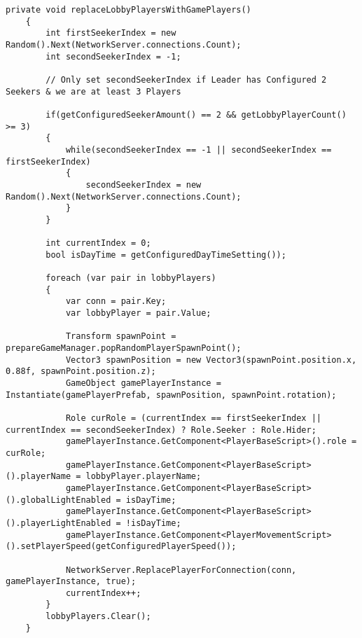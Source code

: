 \begin{lstlisting}[caption= GameNetworkManager.cs replaceLobbyPlayersWithGamePlayers()]
	private void replaceLobbyPlayersWithGamePlayers()
	{
		int firstSeekerIndex = new Random().Next(NetworkServer.connections.Count);
		int secondSeekerIndex = -1;
		
		// Only set secondSeekerIndex if Leader has Configured 2 Seekers & we are at least 3 Players
		
		if(getConfiguredSeekerAmount() == 2 && getLobbyPlayerCount() >= 3)
		{
			while(secondSeekerIndex == -1 || secondSeekerIndex == firstSeekerIndex)
			{
				secondSeekerIndex = new Random().Next(NetworkServer.connections.Count);
			}
		}
		
		int currentIndex = 0;
		bool isDayTime = getConfiguredDayTimeSetting());
		
		foreach (var pair in lobbyPlayers)
		{
			var conn = pair.Key;
			var lobbyPlayer = pair.Value;
			
			Transform spawnPoint = prepareGameManager.popRandomPlayerSpawnPoint();
			Vector3 spawnPosition = new Vector3(spawnPoint.position.x, 0.88f, spawnPoint.position.z);
			GameObject gamePlayerInstance = Instantiate(gamePlayerPrefab, spawnPosition, spawnPoint.rotation);
			
			Role curRole = (currentIndex == firstSeekerIndex || currentIndex == secondSeekerIndex) ? Role.Seeker : Role.Hider;
			gamePlayerInstance.GetComponent<PlayerBaseScript>().role = curRole;
			gamePlayerInstance.GetComponent<PlayerBaseScript>().playerName = lobbyPlayer.playerName;
			gamePlayerInstance.GetComponent<PlayerBaseScript>().globalLightEnabled = isDayTime;
			gamePlayerInstance.GetComponent<PlayerBaseScript>().playerLightEnabled = !isDayTime;
			gamePlayerInstance.GetComponent<PlayerMovementScript>().setPlayerSpeed(getConfiguredPlayerSpeed());
			
			NetworkServer.ReplacePlayerForConnection(conn, gamePlayerInstance, true);
			currentIndex++;
		}
		lobbyPlayers.Clear();
	}
\end{lstlisting}

